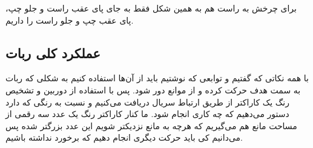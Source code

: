 \begin{latin}
	
\end{latin}

\vspace{1cm}
برای چرخش به راست هم به همین شکل فقط به جای پای عقب راست و جلو چپ، پای عقب چپ و جلو راست را داریم.

\begin{latin}
	
\end{latin}

\subsection{عملکرد کلی ربات}
با همه نکاتی که گفتیم و توابعی که نوشتیم باید از آن‌‌ها استفاده کنیم به شکلی که ربات به سمت هدف حرکت کرده و از موانع دور شود. پس با استفاده از دوربین و تشخیص رنگ یک کاراکتر از طریق ارتباط سریال دریافت می‌کنیم و نسبت به رنگی که دارد دستور می‌دهیم که چه کاری انجام شود. ما کنار کاراکتر رنگ یک عدد سه رقمی از مساحت مانع هم می‌گیریم که هرچه به مانع نزدیکتر شویم این عدد بزرگتر شده پس می‌دانیم کی باید حرکت دیگری انجام دهیم که برخورد نداشته باشیم.

\begin{latin}
	
\end{latin}